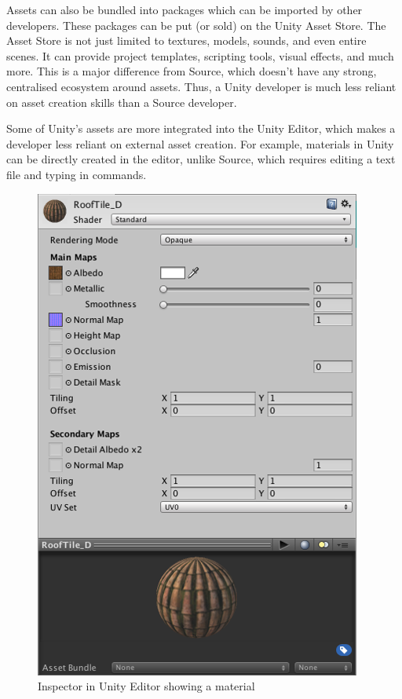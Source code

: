 \documentclass[a4paper, 12pt]{scrartcl}
\begin{document}
Assets can also be bundled into packages which can be imported by other developers. These packages can be put (or sold) on the Unity Asset Store. The Asset Store is not just limited to textures, models, sounds, and even entire scenes. It can provide project templates, scripting tools, visual effects, and much more. This is a major difference from Source, which doesn't have any strong, centralised ecosystem around assets. Thus, a Unity developer is much less reliant on asset creation skills than a Source developer.

Some of Unity's assets are more integrated into the Unity Editor, which makes a developer less reliant on external asset creation. For example, materials in Unity can be directly created in the editor, unlike Source, which requires editing a text file and typing in commands.

\begin{figure}[!ht]
  \centering
  \includegraphics[scale=0.75]{images/unity_material.png}
  \caption{Inspector in Unity Editor showing a material}
  \label{fig:unity_material}
\end{figure}
\end{document}
